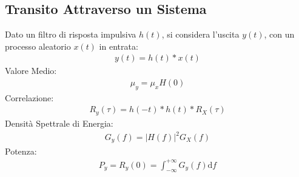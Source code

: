 \documentclass{article}
\newcommand{\df}{\mathrm{d}}
\newcommand{\intinf}{\displaystyle\int_{-\infty}^{+\infty}}
\begin{document}
\subsection*{Transito Attraverso un Sistema}
Dato un filtro di risposta impulsiva $h(t)$, si considera l'uscita $y(t)$, con un processo aleatorio $x(t)$ in entrata:
\begin{gather*}
    y(t)=h(t)*x(t)
\end{gather*}
Valore Medio:
\begin{gather*}
    \mu_y=\mu_xH(0)
\end{gather*}
Correlazione:
\begin{gather*}
    R_y(\tau)=h(-t)*h(t)*R_X(\tau)
\end{gather*}
Densità Spettrale di Energia:
\begin{gather*}
    G_y(f)=|H(f)|^2G_X(f)
\end{gather*}
Potenza:
\begin{gather*}
    P_y=R_y(0)=\intinf G_y(f)\df f
\end{gather*}
\end{document}
